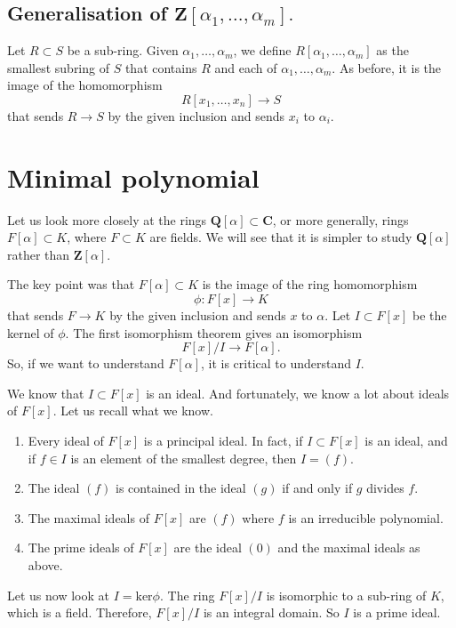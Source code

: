 \documentclass[11pt]{article}
\begin{document}
\subsection{Generalisation of \(\mathbf{Z}[\alpha_{1}, \dots, \alpha_{m}].\)}
\label{sec:orgaa84c24}
Let \(R \subset S\) be a sub-ring.
Given \(\alpha_{1}, \dots, \alpha_{m}\), we define \(R[\alpha_{1}, \dots, \alpha_{m}]\) as the smallest subring of \(S\) that contains \(R\) and each of \(\alpha_{1}, \dots, \alpha_{m}\).
As before, it is the image of the homomorphism
\[ R[x_{1}, \dots, x_{n}] \to S\]
that sends \(R \to S\) by the given inclusion and sends \(x_{i}\) to \(\alpha_{i}\).
\section{Minimal polynomial}
\label{sec:orga90b359}
Let us look more closely at the rings \(\mathbf{Q}[\alpha] \subset \mathbf{C}\), or more generally, rings \(F[\alpha] \subset K\), where \(F \subset K\) are fields.
We will see that it is simpler to study \(\mathbf{Q}[\alpha]\) rather than \(\mathbf{Z}[\alpha]\).

The key point was that \(F[\alpha] \subset K\) is the image of the ring homomorphism
\[ \phi \colon F[x] \to K \]
that sends \(F \to K\) by the given inclusion and sends \(x\) to \(\alpha\).
Let \(I \subset F[x]\) be the kernel of \(\phi\).
The first isomorphism theorem gives an isomorphism
\[ F[x]/I \to F[\alpha].\]
So, if we want to understand \(F[\alpha]\), it is critical to understand \(I\).

We know that \(I \subset F[x]\) is an ideal.
And fortunately, we know a lot about ideals of \(F[x]\).
Let us recall what we know.
\begin{enumerate}
\item Every ideal of \(F[x]\) is a principal ideal.
In fact, if \(I \subset F[x]\) is an ideal, and if \(f \in I\) is an element of the smallest degree, then \(I = (f)\).
\item The ideal \((f)\) is contained in the ideal \((g)\) if and only if \(g\) divides \(f\).
\item The maximal ideals of \(F[x]\) are \((f)\) where \(f\) is an irreducible polynomial.
\item The prime ideals of \(F[x]\) are the ideal \((0)\) and the maximal ideals as above.
\end{enumerate}

Let us now look at \(I = \mathrm{ker}\phi\).
The ring \(F[x]/I\) is isomorphic to a sub-ring of \(K\), which is a field.
Therefore, \(F[x]/I\) is an integral domain.
So \(I\) is a prime ideal.
\end{document}
